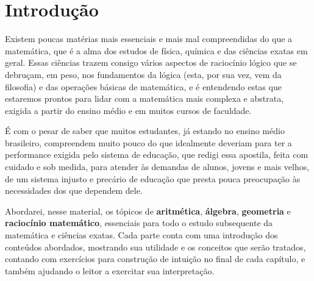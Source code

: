 \chapter*{Introdução}

Existem poucas matérias mais essenciais e mais mal compreendidas do que a matemática, que é a alma dos estudos de física, química e das ciências exatas em geral. Essas ciências trazem consigo vários aspectos de raciocínio lógico que se debruçam, em peso, nos fundamentos da lógica (esta, por sua vez, vem da filosofia) e das operações básicas de matemática, e é entendendo estas que estaremos prontos para lidar com a matemática mais complexa e abstrata, exigida a partir do ensino médio e em muitos cursos de faculdade.

É com o pesar de saber que muitos estudantes, já estando no ensino médio brasileiro, compreendem muito pouco do que idealmente deveriam para ter a performance exigida pelo sistema de educação, que redigi essa apostila, feita com cuidado e sob medida, para atender às demandas de alunos, jovens e mais velhos, de um sistema injusto e precário de educação que presta pouca preocupação às necessidades dos que dependem dele.

Abordarei, nesse material, os tópicos de \textbf{aritmética}, \textbf{álgebra}, \textbf{geometria} e \textbf{raciocínio matemático}, essenciais para todo o estudo subsequente da matemática e ciências exatas. Cada parte conta com uma introdução dos conteúdos abordados, mostrando sua utilidade e os conceitos que serão tratados, contando com exercícios para construção de intuição no final de cada capítulo, e também ajudando o leitor a exercitar sua interpretação.